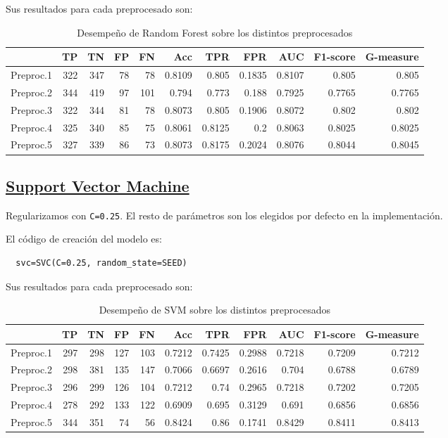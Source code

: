 \documentclass{article}
\begin{document}
Sus resultados para cada preprocesado son:

\begin{table}[H]
\centering
\caption{Desempeño de Random Forest sobre los distintos preprocesados}
\label{tab:rf}
\begin{tabular}{|lrrrrrrrrrr|}
\hline
 & TP & TN & FP & FN & Acc & TPR & FPR & AUC & F1-score & G-measure\\ \hline
  Preproc.1 & 322 & 347 & 78 & 78 & 0.8109 & 0.805 & 0.1835 & 0.8107 & 0.805 & 0.805\\
  Preproc.2 & 344 & 419 & 97 & 101 & 0.794 & 0.773 & 0.188 & 0.7925 & 0.7765 & 0.7765\\
  Preproc.3 & 322 & 344 & 81 & 78 & 0.8073 & 0.805 & 0.1906 & 0.8072 & 0.802 & 0.802\\
  Preproc.4 & 325 & 340 & 85 & 75 & 0.8061 & 0.8125 & 0.2 & 0.8063 & 0.8025 & 0.8025\\
  Preproc.5 & 327 & 339 & 86 & 73 & 0.8073 & 0.8175 & 0.2024 & 0.8076 & 0.8044 & 0.8045\\
\hline
\end{tabular}
\end{table}

\subsection{\href{https://scikit-learn.org/stable/modules/generated/sklearn.svm.SVC.html}{Support Vector Machine}}

Regularizamos con \texttt{C=0.25}. El resto de parámetros son los
elegidos por defecto en la implementación.

El código de creación del modelo es:
\begin{lstlisting}
  svc=SVC(C=0.25, random_state=SEED)
\end{lstlisting}

Sus resultados para cada preprocesado son:

\begin{table}[H]
\centering
\caption{Desempeño de SVM sobre los distintos preprocesados}
\label{tab:svm}
\begin{tabular}{|lrrrrrrrrrr|}
\hline
 & TP & TN & FP & FN & Acc & TPR & FPR & AUC & F1-score & G-measure\\ \hline
  Preproc.1 & 297 & 298 & 127 & 103 & 0.7212 & 0.7425 & 0.2988 & 0.7218 & 0.7209 & 0.7212\\
  Preproc.2 & 298 & 381 & 135 & 147 & 0.7066 & 0.6697 & 0.2616 & 0.704 & 0.6788 & 0.6789\\
  Preproc.3 & 296 & 299 & 126 & 104 & 0.7212 & 0.74 & 0.2965 & 0.7218 & 0.7202 & 0.7205\\
  Preproc.4 & 278 & 292 & 133 & 122 & 0.6909 & 0.695 & 0.3129 & 0.691 & 0.6856 & 0.6856\\
  Preproc.5 & 344 & 351 & 74 & 56 & 0.8424 & 0.86 & 0.1741 & 0.8429 & 0.8411 & 0.8413\\
\hline
\end{tabular}
\end{table}
\end{document}
